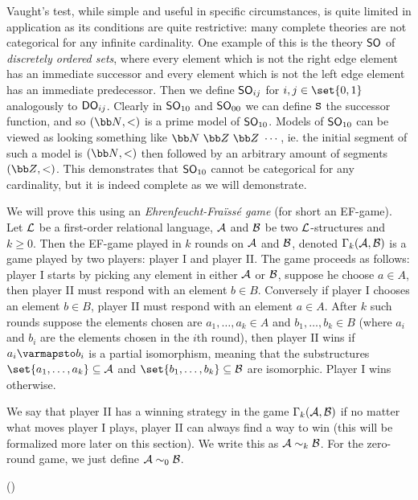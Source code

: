 Vaught's test, while simple and useful in specific circumstances, is quite limited in application as its conditions are quite restrictive: many complete theories are not categorical for any infinite
cardinality.
One example of this is the theory ${\sf SO}$ of {\it discretely ordered sets}, where every element which is not the right edge element has an immediate successor and every element which is not the
left edge element has an immediate predecessor.
Then we define ${\sf SO}_{ij}$ for $i,j\in\set{0,1}$ analogously to ${\sf DO}_{ij}$.
Clearly in ${\sf SO}_{10}$ and ${\sf SO}_{00}$ we can define ${\tt S}$ the successor function, and so $({\bb N},<)$ is a prime model of ${\sf SO}_{10}$.
Models of ${\sf SO}_{10}$ can be viewed as looking something like ${\bb N}\ {\bb Z}\ {\bb Z}\ \cdots$, ie. the initial segment of such a model is $({\bb N},<)$ then followed by an arbitrary amount of
segments $({\bb Z},<)$.
This demonstrates that ${\sf SO}_{10}$ cannot be categorical for any cardinality, but it is indeed complete as we will demonstrate.

We will prove this using an {\it Ehrenfeucht-Fra\"iss\'e game} (for short an EF-game).
Let ${\cal L}$ be a first-order relational language, ${\cal A}$ and ${\cal B}$ be two ${\cal L}$-structures and $k\geq0$.
Then the EF-game played in $k$ rounds on ${\cal A}$ and ${\cal B}$, denoted $\Gamma_k({\cal A},{\cal B})$ is a game played by two players: player I and player II.
The game proceeds as follows: player I starts by picking any element in either ${\cal A}$ or ${\cal B}$, suppose he choose $a\in A$, then player II must respond with an element $b\in B$.
Conversely if player I chooses an element $b\in B$, player II must respond with an element $a\in A$.
After $k$ such rounds suppose the elements chosen are $a_1,\dots,a_k\in A$ and $b_1,\dots,b_k\in B$ (where $a_i$ and $b_i$ are the elements chosen in the $i$th round), then player II wins if
$a_i\varmapsto b_i$ is a partial isomorphism, meaning that the substructures $\set{a_1,\dots,a_k}\subseteq{\cal A}$ and $\set{b_1,\dots,b_k}\subseteq{\cal B}$ are isomorphic.
Player I wins otherwise.

We say that player II has a winning strategy in the game $\Gamma_k({\cal A},{\cal B})$ if no matter what moves player I plays, player II can always find a way to win (this will be formalized more later on
this section).
We write this as ${\cal A}\sim_k{\cal B}$.
For the zero-round game, we just define ${\cal A}\sim_0{\cal B}$.

\bexam
    ({})

